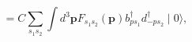\begin{equation}
=C\underset{s_{1}s_{2}}{\sum }\int d^{3}\mathbf{p}F_{s_{1}s_{2}}(\mathbf{p}%
)b_{ps_{1}}^{\dagger }d_{-ps_{2}}^{\dagger }\mid 0\rangle ,
\end{equation}


